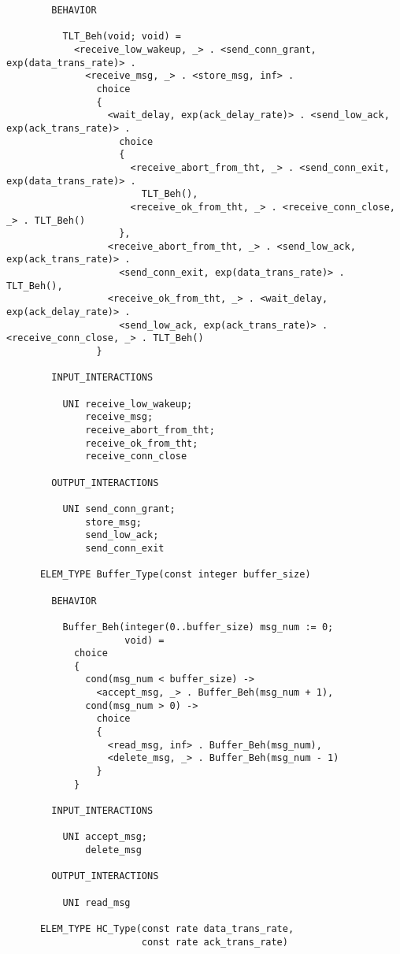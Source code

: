 \begin{verbatim}
        BEHAVIOR

          TLT_Beh(void; void) =
            <receive_low_wakeup, _> . <send_conn_grant, exp(data_trans_rate)> .
              <receive_msg, _> . <store_msg, inf> .
                choice
                {
                  <wait_delay, exp(ack_delay_rate)> . <send_low_ack, exp(ack_trans_rate)> .
                    choice
                    {
                      <receive_abort_from_tht, _> . <send_conn_exit, exp(data_trans_rate)> .
                        TLT_Beh(),
                      <receive_ok_from_tht, _> . <receive_conn_close, _> . TLT_Beh()
                    },
                  <receive_abort_from_tht, _> . <send_low_ack, exp(ack_trans_rate)> .
                    <send_conn_exit, exp(data_trans_rate)> . TLT_Beh(),
                  <receive_ok_from_tht, _> . <wait_delay, exp(ack_delay_rate)> .
                    <send_low_ack, exp(ack_trans_rate)> . <receive_conn_close, _> . TLT_Beh()
                }

        INPUT_INTERACTIONS

          UNI receive_low_wakeup;
              receive_msg;
              receive_abort_from_tht;
              receive_ok_from_tht;
              receive_conn_close

        OUTPUT_INTERACTIONS

          UNI send_conn_grant;
              store_msg;
              send_low_ack;
              send_conn_exit

      ELEM_TYPE Buffer_Type(const integer buffer_size)

        BEHAVIOR

          Buffer_Beh(integer(0..buffer_size) msg_num := 0;
                     void) =
            choice
            {
              cond(msg_num < buffer_size) ->
                <accept_msg, _> . Buffer_Beh(msg_num + 1),
              cond(msg_num > 0) ->
                choice
                {
                  <read_msg, inf> . Buffer_Beh(msg_num),
                  <delete_msg, _> . Buffer_Beh(msg_num - 1)
                }
            }

        INPUT_INTERACTIONS

          UNI accept_msg;
              delete_msg

        OUTPUT_INTERACTIONS

          UNI read_msg

      ELEM_TYPE HC_Type(const rate data_trans_rate,
                        const rate ack_trans_rate)


\end{verbatim}
